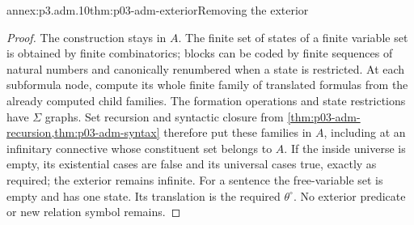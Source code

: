 \begin{annexitem}{annex:p3.adm.10}{thm:p03-adm-exterior}{Removing the exterior}
\begin{proof}
The construction stays in \(A\). The finite set of states of a finite
variable set is obtained by finite combinatorics; blocks can be coded
by finite sequences of natural numbers and canonically renumbered when
a state is restricted. At each subformula node, compute its whole finite
family of translated formulas from the already computed child families.
The formation operations and state restrictions have \(\Sigma\) graphs.
Set recursion and syntactic closure from
\cref{thm:p03-adm-recursion,thm:p03-adm-syntax} therefore put these
families in \(A\), including at an infinitary connective whose
constituent set belongs to \(A\). If the inside universe is empty, its existential cases are false
and its universal cases true, exactly as required; the exterior remains
infinite. For a sentence the free-variable set is empty and has one state. Its translation is the required
\(\theta^\circ\). No exterior predicate or new relation symbol remains.
\end{proof}
\end{annexitem}

